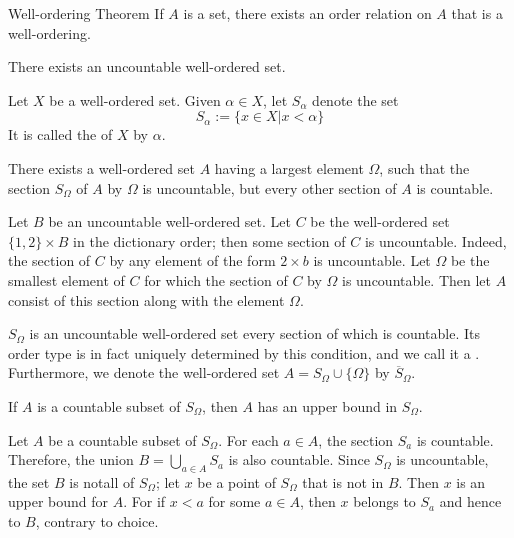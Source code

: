 \documentclass[12pt, a4paper, twoside, openright, titlepage]{book}
\begin{document}
\begin{appendices}
    \begin{namthm}{Well-ordering Theorem}{}
        If $A$ is a set, there exists an order relation on $A$ that is a well-ordering.
    \end{namthm}


    \begin{cor}{}{}
        There exists an uncountable well-ordered set.
    \end{cor}


    \begin{defn}{}{}
        Let $X$ be a well-ordered set. Given $\alpha \in X$, let $S_{\alpha}$ denote the set \begin{equation*}
            S_{\alpha} := \{x \in X\vert x < \alpha\}
        \end{equation*}
        It is called the  of $X$ by $\alpha$.
    \end{defn}


    \begin{lem}{}{}
        There exists a well-ordered set $A$ having a largest element $\Omega$, such that the section $S_{\Omega}$ of $A$ by $\Omega$ is uncountable, but every other section of $A$ is countable.
    \end{lem}
    \begin{proof*}{}{}
        Let $B$ be an uncountable well-ordered set. Let $C$ be the well-ordered set $\{1,2\}\times B$ in the dictionary order; then some section of $C$ is uncountable. Indeed, the section of $C$ by any element of the form $2\times b$ is uncountable. Let $\Omega$ be the smallest element of $C$ for which the section of $C$ by $\Omega$ is uncountable. Then let $A$ consist of this section along with the element $\Omega$.
    \end{proof*}

    \begin{rmk}{}{}
        $S_{\Omega}$ is an uncountable well-ordered set every section of which is countable. Its order type is in fact uniquely determined by this condition, and we call it a . Furthermore, we denote the well-ordered set $A = S_{\Omega}\cup\{\Omega\}$ by $\overline{S}_{\Omega}$.
    \end{rmk}

    \begin{thm}{}{}
        If $A$ is a countable subset of $S_{\Omega}$, then $A$ has an upper bound in $S_{\Omega}$.
    \end{thm}
    \begin{proof*}{}{}
        Let $A$ be a countable subset of $S_{\Omega}$. For each $a \in A$, the section $S_a$ is countable. Therefore, the union $B = \bigcup_{a\in A}S_a$ is also countable. Since $S_{\Omega}$ is uncountable, the set $B$ is notall of $S_{\Omega}$; let $x$ be a point of $S_{\Omega}$ that is not in $B$. Then $x$ is an upper bound for $A$. For if $x < a$ for some $a \in A$, then $x$ belongs to $S_a$ and hence to $B$, contrary to choice.
    \end{proof*}



\end{appendices}
\end{document}
